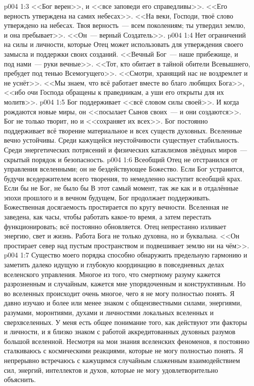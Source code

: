 \vs p004 1:3 <<Бог верен>>, и <<все заповеди его справедливы>>. <<Его верность утверждена на самих небесах>>. <<На веки, Господи, твоё слово утверждено на небесах. Твоя верность~--- всем поколениям; ты утвердил землю, и она пребывает>>. <<Он~--- верный Создатель>>.
\vs p004 1:4 Нет ограничений на силы и личности, которые Отец может использовать для утверждения своего замысла и поддержки своих созданий. <<Вечный Бог~--- наше прибежище, и под нами~--- руки вечные>>. <<Тот, кто обитает в тайной обители Всевышнего, пребудет под тенью Всемогущего>>. <<Смотри, хранящий нас не воздремлет и не уснёт>>. <<Мы знаем, что всё работает вместе во благо любящих Бога>>, <<ибо очи Господа обращены к праведникам, а уши его открыты для их молитв>>.
\vs p004 1:5 Бог поддерживает <<всё словом силы своей>>. И когда рождаются новые миры, он <<посылает Сынов своих~--- и они создаются>>. Бог не только творит, но и <<сохраняет их всех>>. Бог постоянно поддерживает всё творение материальное и всех существ духовных. Вселенные вечно устойчивы. Среди кажущейся неустойчивости существует стабильность. Среди энергетических потрясений и физических катаклизмов звёздных миров~--- скрытый порядок и безопасность.
\vs p004 1:6 Всеобщий Отец не отстранился от управления вселенными; он не бездействующее Божество. Если Бог устранится, будучи вседержителем всего творения, то немедленно наступит всеобщий крах. Если бы не Бог, не было бы  В этот самый момент, так же как и в отдалённые эпохи прошлого и в вечном будущем, Бог продолжает поддерживать. Божественная досягаемость простирается по кругу вечности. Вселенная не заведена, как часы, чтобы работать какое\hyp{}то время, а затем перестать функционировать; всё постоянно обновляется. Отец непрестанно изливает энергию, свет и жизнь. Работа Бога не только духовна, но и буквальна. <<Он простирает север над пустым пространством и подвешивает землю ни на чём>>.
\vs p004 1:7 \pc Существо моего порядка способно обнаружить предельную гармонию и заметить далеко идущую и глубокую координацию в повседневных делах вселенского управления. Многое из того, что смертному разуму кажется разрозненным и случайным, кажется мне упорядоченным и конструктивным. Но во вселенных происходит очень многое, чего я не могу полностью понять. Я давно изучаю и более или менее знаком с общеизвестными силами, энергиями, разумами, моронтиями, духами и личностями локальных вселенных и сверхвселенных. У меня есть общее понимание того, как действуют эти факторы и личности, и я близко знаком с работой аккредитованных духовных разумов большой вселенной. Несмотря на мои знания вселенских феноменов, я постоянно сталкиваюсь с космическими реакциями, которые не могу полностью понять. Я непрерывно встречаюсь с кажущимся случайным слаженным взаимодействием сил, энергий, интеллектов и духов, которые не могу удовлетворительно объяснить.
